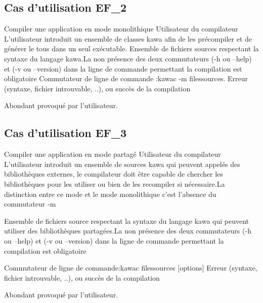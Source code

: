 \subsection{Cas d'utilisation EF\_2}
\fiche
{Compiler une application en mode monolithique}                    %
{Utilisateur du compilateur}                               %
{                                                %
  L'utilisateur introduit un ensemble de classes
  kawa afin de les précompiler et de générer le tous dans un seul exécutable.
}
{
	Ensemble de fichiers sources 
	respectant la syntaxe du langage kawa.La non présence des deux commutateurs (-h ou --help) et (-v ou --version) dans la ligne de commande permettant la compilation est obligatoire
}                                                %
{Commutateur de ligne de commande :kawac -m filessources.}                             %
{Erreur (syntaxe, fichier introuvable, ..), ou 
 succès de la compilation}                       %
{                                                %
  
}
{} %
{ Abondant provoqué par l'utilisateur. } %


\subsection{Cas d'utilisation EF\_3}
\fiche
{Compiler une application en mode partagé}                    %
{Utilisateur du compilateur}                               %
{                                                %
  L’utilisateur introduit un ensemble de sources kawa
 qui peuvent appelés des bibliothèques externes, le compilateur doit être capable de chercher les bibliothèques pour les utiliser ou bien  de les recompiler si nécessaire.La distinction entre ce mode et le mode monolithique c'est l'absence du commutateur -m 
}
{
	Ensemble de fichiers source respectant la syntaxe du langage kawa qui peuvent utiliser des bibliothèques partagées.La non présence des deux commutateurs (-h ou --help) et (-v ou --version) dans la ligne de commande permettant la compilation est obligatoire
	
}                                                %
{Commutateur de ligne de commande:kawac filessources [options]}                             %
{Erreur (syntaxe, fichier introuvable, ..), ou 
 succès de la compilation}                       %
{                                                %
  
}{} %
{Abondant provoqué par l'utilisateur.} %


